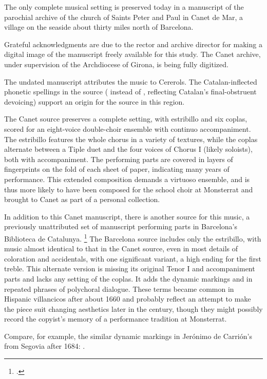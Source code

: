 The only complete musical setting is preserved today in a manuscript of the
parochial archive of the church of Saints Peter and Paul in Canet de Mar, a
village on the seaside about thirty miles north of Barcelona.%
\begin{Footnote}
    Grateful acknowledgments are due to the rector and archive director for
    making a digital image of the manuscript freely available for this study.
    The Canet archive, under supervision of the Archdiocese of Girona, is being
    fully digitized.
\end{Footnote}
The undated manuscript attributes the music to Cererols.%
    \Autocite{Bonastre:CanetCatalog}
The Catalan-inflected phonetic spellings in the source ( instead
of , reflecting Catalan's final-obstruent devoicing) support an
origin for the source in this region.%
    \Autocite{Myers:CatalanPhonology}


The Canet source preserves a complete setting, with estribillo and six coplas,
scored for an eight-voice double-choir ensemble with continuo accompaniment.
The estribillo features the whole chorus in a variety of textures, while the
coplas alternate between a Tiple duet and the four voices of Chorus I (likely
soloists), both with accompaniment.
The performing parts are covered in layers of fingerprints on the fold of each
sheet of paper, indicating many years of performance.
This extended composition demands a virtuoso ensemble, and is thus more likely
to have been composed for the school choir at Monsterrat and brought to Canet as
part of a personal collection.

In addition to this Canet manuscript, there is another source for this music, a
previously unattributed set of manuscript performing parts in Barcelona's
Biblioteca de Catalunya.%
    \footnote{.}
The Barcelona source includes only the estribillo, with music almost identical
to that in the Canet source, even in most details of coloration and accidentals,
with one significant variant, a  high ending for the first treble.
This alternate version is missing its original Tenor I and accompaniment parts
and lacks any setting of the coplas.
It adds the dynamic markings  and  in repeated phrases
of polychoral dialogue. 
These terms became common in Hispanic villancicos after about 1660 and probably
reflect an attempt to make the piece suit changing aesthetics later in the
century, though they might possibly record the copyist's memory of a performance
tradition at Monsterrat.%
\begin{Footnote}
    Compare, for example, the similar dynamic markings in Jerónimo de Carrión's
     from Segovia after 1684: 
    \autocite[331--336]{Cashner:PhD}.
\end{Footnote}

